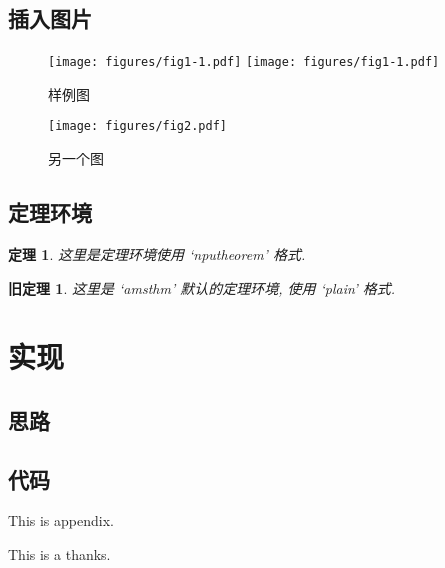 \documentclass[twoside,UTF8,phd]{nputhesis}
\newtheorem{thm}{定理}[section]
\theoremstyle{plain}
\newtheorem{oldthm}{旧定理}[section]
\begin{document}
\section{插入图片}
\lipsum[1-3]
\begin{figure}
    \centering
    \texttt{[image: figures/fig1-1.pdf]}
    \texttt{[image: figures/fig1-1.pdf]}
    \caption{样例图}
\end{figure}
\begin{figure}
    \centering
    \texttt{[image: figures/fig2.pdf]}
    \caption{另一个图}
\end{figure}
\lipsum[4-6]
\section{定理环境}
\lipsum[1]
\begin{thm}
    这里是定理环境使用 `nputheorem' 格式.
\end{thm}
\lipsum[2]
\begin{oldthm}
    这里是 `amsthm' 默认的定理环境, 使用 `plain' 格式.
\end{oldthm}
\lipsum[3]

\chapter{实现}
\section{思路}
\section{代码}


\backmatter



\Appendix
This is appendix.

\Thanks
This is a thanks.

\Work

\statement
\end{document}
